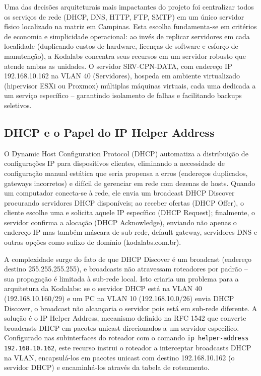 \documentclass[12pt,a4paper]{article}
\begin{document}
Uma das decisões arquiteturais mais impactantes do projeto foi centralizar todos os serviços de rede (DHCP, DNS, HTTP, FTP, SMTP) em um único servidor físico localizado na matriz em Campinas. Esta escolha fundamenta-se em critérios de economia e simplicidade operacional: ao invés de replicar servidores em cada localidade (duplicando custos de hardware, licenças de software e esforço de manutenção), a Kodalabs concentra seus recursos em um servidor robusto que atende ambas as unidades. O servidor SRV-CPN-DATA, com endereço IP 192.168.10.162 na VLAN 40 (Servidores), hospeda em ambiente virtualizado (hipervisor ESXi ou Proxmox) múltiplas máquinas virtuais, cada uma dedicada a um serviço específico -- garantindo isolamento de falhas e facilitando backups seletivos.

\subsection{DHCP e o Papel do IP Helper Address}

O Dynamic Host Configuration Protocol (DHCP) automatiza a distribuição de configurações IP para dispositivos clientes, eliminando a necessidade de configuração manual estática que seria propensa a erros (endereços duplicados, gateways incorretos) e difícil de gerenciar em rede com dezenas de hosts. Quando um computador conecta-se à rede, ele envia um broadcast DHCP Discover procurando servidores DHCP disponíveis; ao receber ofertas (DHCP Offer), o cliente escolhe uma e solicita aquele IP específico (DHCP Request); finalmente, o servidor confirma a alocação (DHCP Acknowledge), enviando não apenas o endereço IP mas também máscara de sub-rede, default gateway, servidores DNS e outras opções como sufixo de domínio (kodalabs.com.br).

A complexidade surge do fato de que DHCP Discover é um broadcast (endereço destino 255.255.255.255), e broadcasts não atravessam roteadores por padrão -- sua propagação é limitada à sub-rede local. Isto criaria um problema para a arquitetura da Kodalabs: se o servidor DHCP está na VLAN 40 (192.168.10.160/29) e um PC na VLAN 10 (192.168.10.0/26) envia DHCP Discover, o broadcast não alcançaria o servidor pois está em sub-rede diferente. A solução é o IP Helper Address, mecanismo definido na RFC 1542 que converte broadcasts DHCP em pacotes unicast direcionados a um servidor específico. Configurado nas subinterfaces do roteador com o comando \texttt{ip helper-address 192.168.10.162}, este recurso instrui o roteador a interceptar broadcasts DHCP na VLAN, encapsulá-los em pacotes unicast com destino 192.168.10.162 (o servidor DHCP) e encaminhá-los através da tabela de roteamento.
\end{document}
